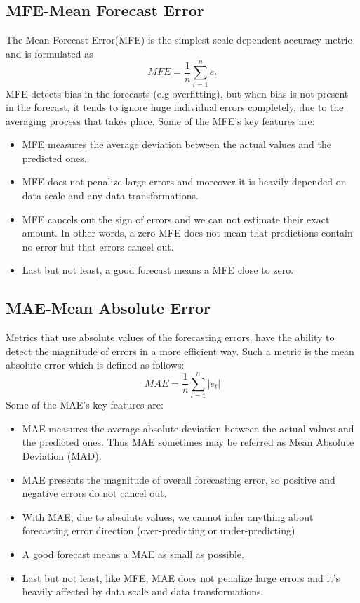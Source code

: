 \subsection{MFE-Mean Forecast Error}
 The Mean Forecast Error(MFE) is the simplest scale-dependent accuracy metric and is formulated as $$MFE=\frac{1}{n}\sum_{t=1}^{n}{e_{t}}$$
 MFE detects bias in the forecasts (e.g overfitting), but when bias is not present in the forecast, it tends to ignore huge individual errors completely, due to the averaging process that takes place.
Some of the MFE's key features are: 
 \begin{itemize}
     \item MFE measures the average deviation between the actual values and the predicted ones. 
     \item MFE does not penalize large errors and moreover it is heavily depended on data scale and any data transformations. 
     \item MFE cancels out the sign of errors and we can not estimate their exact amount. In other words, a zero MFE does not mean that predictions contain no error but that errors cancel out.
     \item Last but not least, a good forecast means a MFE close to zero.
 \end{itemize}
\subsection{MAE-Mean Absolute Error}
Metrics that use absolute values of the forecasting errors, have the ability to detect the magnitude of errors in a more efficient way. Such a metric is the mean absolute error which is defined as follows:
 $$MAE=\frac{1}{n}\sum_{t=1}^{n}{|e_{t}|}$$  
Some of the MAE's key features are: 
 \begin{itemize}
    \item MAE measures the average absolute deviation between the actual values and the predicted ones. Thus MAE sometimes may be referred as Mean Absolute Deviation (MAD).
    \item MAE presents the magnitude of overall forecasting error, so positive and negative errors do not cancel out. 
    \item With MAE, due to absolute values, we cannot infer anything about forecasting error direction (over-predicting or under-predicting)
    \item A good forecast means a MAE as small as possible. 
    \item Last but not least, like MFE, MAE does not penalize large errors and it's heavily affected by data scale and data transformations. 
 \end{itemize}
